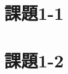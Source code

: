\documentclass[a4j,11pt]{jarticle}
\begin{document}

\section{課題1-1}






\section{課題1-2}
\end{document}

